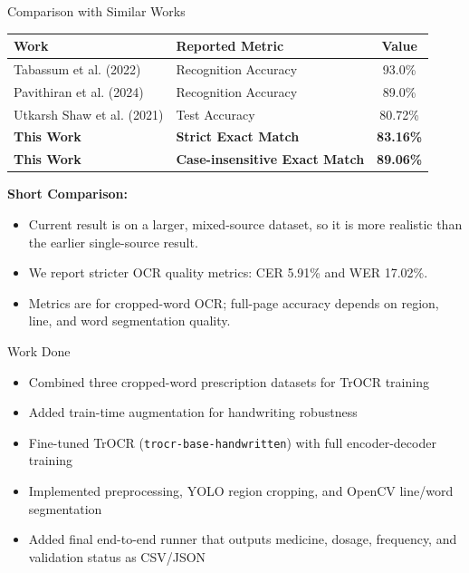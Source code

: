 \documentclass{beamer}
\begin{document}
\begin{frame}{Comparison with Similar Works}
\centering
\small
\begin{table}[h!]
\centering
\renewcommand{\arraystretch}{1.15}
\begin{tabular}{p{3.1cm} p{2.4cm} c}
\hline
\textbf{Work} & \textbf{Reported Metric} & \textbf{Value} \\
\hline
Tabassum et al. (2022) & Recognition Accuracy & 93.0\% \\
Pavithiran et al. (2024) & Recognition Accuracy & 89.0\% \\
Utkarsh Shaw et al. (2021) & Test Accuracy & 80.72\% \\
\textbf{This Work} & \textbf{Strict Exact Match} & \textbf{83.16\%} \\
\textbf{This Work} & \textbf{Case-insensitive Exact Match} & \textbf{89.06\%} \\
\hline
\end{tabular}
\end{table}

\vspace{0.2cm}
\footnotesize
\textbf{Short Comparison:}
\begin{itemize}
    \item Current result is on a larger, mixed-source dataset, so it is more realistic than the earlier single-source result.
    \item We report stricter OCR quality metrics: CER 5.91\% and WER 17.02\%.
    \item Metrics are for cropped-word OCR; full-page accuracy depends on region, line, and word segmentation quality.
\end{itemize}
\end{frame}


\begin{frame}{Work Done}
\begin{itemize}
    \item Combined three cropped-word prescription datasets for TrOCR training
    \item Added train-time augmentation for handwriting robustness
    \item Fine-tuned TrOCR (\texttt{trocr-base-handwritten}) with full encoder-decoder training
    \item Implemented preprocessing, YOLO region cropping, and OpenCV line/word segmentation
    \item Added final end-to-end runner that outputs medicine, dosage, frequency, and validation status as CSV/JSON
\end{itemize}
\end{frame}
\end{document}
